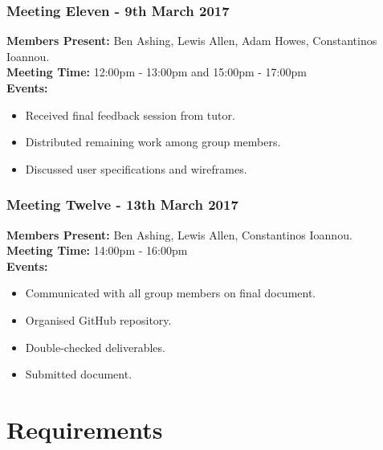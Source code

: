 \documentclass[a4paper]{article}
\begin{document}
\subsubsection*{Meeting Eleven - 9th March 2017}
\textbf{Members Present:} Ben Ashing, Lewis Allen, Adam Howes, Constantinos Ioannou. \\
\textbf{Meeting Time:} 12:00pm - 13:00pm and 15:00pm - 17:00pm \\
\textbf{Events:} 
\begin{itemize}
    \item Received final feedback session from tutor.
    \item Distributed remaining work among group members.
    \item Discussed user specifications and wireframes.
\end{itemize}

\subsubsection*{Meeting Twelve - 13th March 2017}
\textbf{Members Present:} Ben Ashing, Lewis Allen, Constantinos Ioannou. \\
\textbf{Meeting Time:} 14:00pm - 16:00pm \\
\textbf{Events:} 
\begin{itemize}
    \item Communicated with all group members on final document.
    \item Organised GitHub repository.
    \item Double-checked deliverables.
    \item Submitted document.
\end{itemize}

\break
\section{Requirements}
\end{document}
